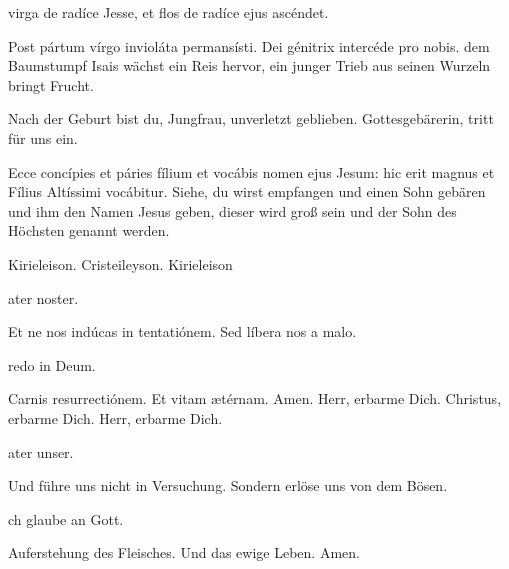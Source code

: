 \documentclass[fontsize=10pt,paper=A5,twoside,BCOR=1mm,DIV=21,headinclude]{scrarticle}
\begin{document}

\vspace{.3em}

\begin{paracol}{2}\pcb
{} virga de radíce Jesse, et flos de radíce ejus ascéndet.

\V Post pártum vírgo invioláta permansísti.
\R Dei génitrix intercéde pro nobis.
	\switchcolumn
	 dem Baumstumpf Isais wächst ein Reis hervor, ein junger Trieb aus seinen Wurzeln bringt Frucht.

	\V Nach der Geburt bist du, Jungfrau, unverletzt geblieben.
	\R Gottesgebärerin, tritt für uns ein.
\end{paracol}


\vspace{.3em}

\begin{paracol}{2}\pcb
\A Ecce concípies et páries fílium et vocábis nomen ejus Jesum: hic erit magnus et Fílius Altíssimi vocábitur. 
	\switchcolumn
	\A Siehe, du wirst empfangen und einen Sohn gebären und ihm den Namen Jesus geben, dieser wird groß sein und der Sohn des Höchsten genannt werden.
\end{paracol}


\begin{paracol}{2} \pcb
\V Kirieleison.
\R Cristeileyson.
\V Kirieleison

ater noster. 

\V Et ne nos indúcas in tentatiónem.
\R Sed líbera nos a malo.

redo in Deum. 

\V Carnis resurrectiónem.
\R Et vitam ætérnam. Amen.
	\switchcolumn
	\V Herr, erbarme Dich. \R Christus, erbarme Dich. \V Herr, erbarme Dich.

	ater unser. 

	\V Und führe uns nicht in Versuchung.
	\R Sondern erlöse uns von dem Bösen.

	ch glaube an Gott. 

	\V Auferstehung des Fleisches.
	\R Und das ewige Leben. Amen.
\end{paracol}

\end{document}
